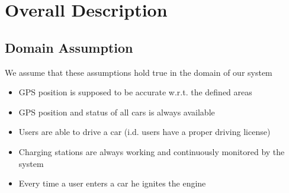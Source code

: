 \section{Overall Description}
\subsection{Domain Assumption}
	We assume that these assumptions hold true in the domain of our system 
	\begin{itemize}
		\item GPS position is supposed to be accurate w.r.t. the defined areas
		\item GPS position and status of all cars is always available
		\item Users are able to drive a car (i.d. users have a proper driving license)
		\item Charging stations are always working and continuously monitored by the system
		\item Every time a user enters a car he ignites the engine
	\end{itemize}